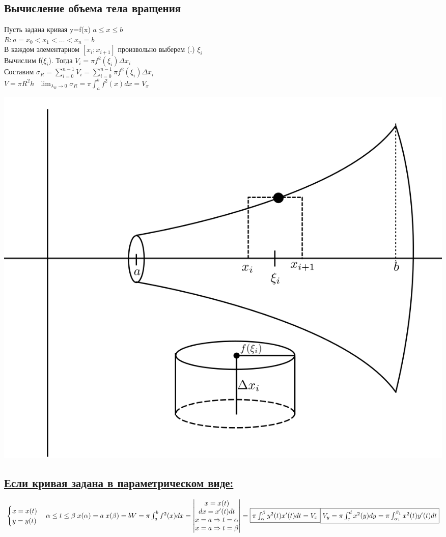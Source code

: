 \documentclass[12pt]{article}
\let\ORIincludegraphics\includegraphics
\renewcommand{\includegraphics}[2][]{\ORIincludegraphics[scale=0.65,#1]{#2}}
\begin{document}
    \subsection{Вычисление объема тела вращения}
    Пусть задана кривая y=f(x) $a\leq x\leq b$\\
    $R:a=x_0<x_1<\dots<x_n=b$\\
    В каждом элементарном $[x_i;x_{i+1}]$ произвольно выберем (.) $\xi_i$\\
    Вычислим f($\xi_i$). Тогда $V_i=\pi f^2(\xi_i)\Delta x_i$\\
    Составим $\sigma_R=\sum_{i=0}^{n-1}V_i=\sum_{i=0}^{n-1}\pi f^2(\xi_i)\Delta x_i$\\
    $V=\pi R^2h\text{   } \lim_{\lambda_R \to 0}\sigma_R = \pi \int_{a}^{b}f^2(x)dx=V_x$
    \begin{center}
        \includegraphics[width=0.7\linewidth]{6.11.1.png}
    \end{center}
    \subsection*{\underline{Если кривая задана в параметрическом виде:}}
    \begin{math}
        \begin{cases}
            x=x(t)\\
            y=y(t)
        \end{cases} \alpha \leq t \leq \beta \; x(\alpha)=a \; x(\beta)=b\\
        V=\pi \int_{a}^{b}f^2(x)dx =
        \begin{vmatrix}
            x=x(t)\\
            dx=x'(t)dt\\
            x=a \Rightarrow t=\alpha\\
            x=a \Rightarrow t=\beta
        \end{vmatrix}=
        \fbox{$\pi \int_{\alpha}^{\beta} y^2(t)x'(t)dt=V_x$}\\
        \fbox{$V_y=\pi \int_{c}^{d} x^2(y)dy=\pi \int_{\alpha_1}^{\beta_1} x^2(t)y'(t)dt$}
    \end{math}
\end{document}
